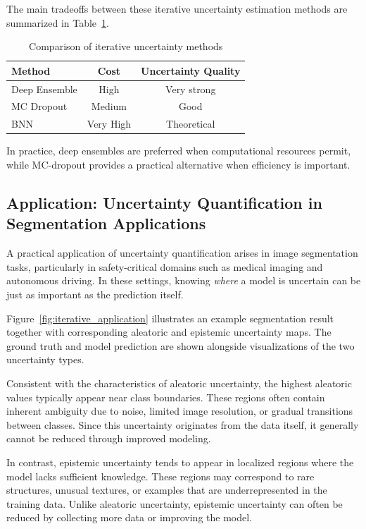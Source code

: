 \documentclass{article}
\begin{document}
The main tradeoffs between these iterative uncertainty estimation methods are summarized in Table~\ref{tab:iter_uncertainty}.

\begin{table}[H]
\centering
\begin{tabular}{lcc}
Method & Cost & Uncertainty Quality \\
\hline
Deep Ensemble & High & Very strong \\
MC Dropout & Medium & Good \\
BNN & Very High & Theoretical
\end{tabular}
\caption{Comparison of iterative uncertainty methods}
\label{tab:iter_uncertainty}
\end{table}

In practice, deep ensembles are preferred when computational resources permit, while MC-dropout provides a practical alternative when efficiency is important.

\subsection{Application: Uncertainty Quantification in Segmentation Applications}

A practical application of uncertainty quantification arises in image segmentation tasks, particularly in safety-critical domains such as medical imaging and autonomous driving. In these settings, knowing \textit{where} a model is uncertain can be just as important as the prediction itself.

Figure~\ref{fig:iterative_application} illustrates an example segmentation result together with corresponding aleatoric and epistemic uncertainty maps. The ground truth and model prediction are shown alongside visualizations of the two uncertainty types.

Consistent with the characteristics of aleatoric uncertainty, the highest aleatoric values typically appear near class boundaries. These regions often contain inherent ambiguity due to noise, limited image resolution, or gradual transitions between classes. Since this uncertainty originates from the data itself, it generally cannot be reduced through improved modeling.

In contrast, epistemic uncertainty tends to appear in localized regions where the model lacks sufficient knowledge. These regions may correspond to rare structures, unusual textures, or examples that are underrepresented in the training data. Unlike aleatoric uncertainty, epistemic uncertainty can often be reduced by collecting more data or improving the model.
\end{document}
